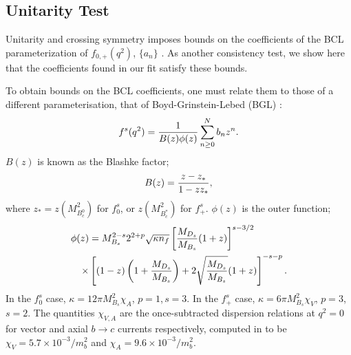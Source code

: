 \subsection{Unitarity Test}

Unitarity and crossing symmetry imposes bounds on the coefficients of the BCL parameterization of $f_{0,+}(q^2)$, $\{a_n\}$ \cite{PhysRevD.4.725,PhysRevD.3.2807}. As another consistency test, we show here that the coefficients found in our fit satisfy these bounds.

To obtain bounds on the BCL coefficients, one must relate them to those of a different parameterisation, that of Boyd-Grinstein-Lebed (BGL) \cite{GLENNBOYD1996493}:
\begin{align}
  f^s(q^2) = {1\over B(z)\phi(z)} \sum^N_{n\geq 0} b_n z^n.
\end{align}
$B(z)$ is known as the Blashke factor;
\begin{align}
  B(z) = { z - z_* \over 1 - z z_* },
\end{align}
where $z_* = z(M^2_{B_c^0})$ for $f_0^s$, or $z(M^2_{B_c^*})$ for $f_+^s$. $\phi(z)$ is the outer function;
\begin{align}
  \phi(z) &= M_{B_s}^{2-s} 2^{2+p} \sqrt{\kappa n_f}
  \left[ {M_{D_s}\over M_{B_s}} (1+z)\right]^{s-3/2} \nonumber \\
  \times &\left[ (1-z)\left(1+{M_{D_s}\over M_{B_s}}\right)+2\sqrt{M_{D_s}\over M_{B_s}}(1+z)\right]^{-s-p}.
\end{align}
In the $f^s_0$ case, $\kappa=12\pi M^2_{B_s}\chi_A$, $p=1$,\,$s=3$. In the $f^s_+$ case, $\kappa=6\pi M^2_{B_s} \chi_V$, $p=3$,\,$s=2$. The quantities $\chi_{V,A}$ are the once-subtracted dispersion relations at $q^2=0$ for vector and axial $b\to c$ currents respectively, computed in \cite{GLENNBOYD1996493} to be $\chi_V = 5.7\times 10^{-3}/m_b^2$ and $\chi_A = 9.6\times 10^{-3}/m_b^2$.

